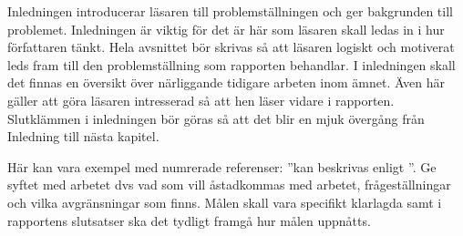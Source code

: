 Inledningen introducerar läsaren till problemställningen och ger bakgrunden till problemet. Inledningen är viktig för det är här som läsaren skall ledas in i hur författaren tänkt. Hela avsnittet bör skrivas så att läsaren logiskt och motiverat leds fram till den problemställning som rapporten behandlar. I inledningen skall det finnas en översikt över närliggande tidigare arbeten inom ämnet. Även här gäller att göra läsaren intresserad så att hen läser vidare i rapporten. Slutklämmen i inledningen bör göras så att det blir en mjuk övergång från Inledning till nästa kapitel.



Här kan vara exempel med numrerade referenser: ''kan beskrivas enligt \cite{Sterte2001}''.
Ge syftet med arbetet dvs vad som vill åstadkommas med arbetet, frågeställningar och vilka avgränsningar som finns. Målen skall vara specifikt klarlagda samt i rapportens slutsatser ska det tydligt framgå hur målen uppnåtts.

%
%
